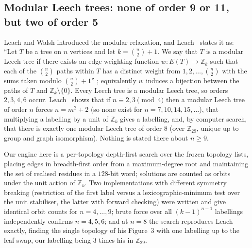 \documentclass[11pt,a4paper]{article}
\theoremstyle{plain}
\theoremstyle{remark}
\newcommand{\Z}{\mathbb{Z}}
\newcommand{\bin}[2]{\binom{#1}{#2}}
\begin{document}
\subsection{Modular Leech trees: none of order 9 or 11, but two of order 5}
\label{sec:modular}

Leach and Walsh introduced the modular relaxation, and Leach~\cite{Leach2014}
states it as: ``Let $T$ be a tree on $n$ vertices and let $k=\bin n2+1$.  We say
that $T$ is a modular Leech tree if there exists an edge weighting function
$w:E(T)\to\Z_k$ such that each of the $\bin n2$ paths within $T$ has a distinct
weight from $1,2,\dots,\bin n2$ with the sums taken modulo $\bin n2+1$''
\cite[p.~1]{Leach2014}; equivalently $w$ induces a bijection between the paths of
$T$ and $\Z_k\setminus\{0\}$.  Every Leech tree is a modular Leech tree, so
orders $2,3,4,6$ occur.  Leach~\cite[Thms.~1--2]{Leach2014} shows that if
$n\equiv 2,3\pmod 4$ then a modular Leech tree of order $n$ forces $n=m^2+2$
(so none exist for $n=7,10,14,15,\dots$), that multiplying a labelling by a unit
of $\Z_k$ gives a labelling, and, by computer search, that there is exactly one
modular Leech tree of order $8$ (over $\Z_{29}$, unique up to group and graph
isomorphism).  Nothing is stated there about $n\ge 9$.

Our engine here is a per-topology depth-first search over the frozen topology
lists, placing edges in breadth-first order from a maximum-degree root and
maintaining the set of realised residues in a $128$-bit word; solutions are
counted as orbits under the unit action of $\Z_k$.  Two implementations with
different symmetry breaking (restriction of the first label versus a
lexicographic-minimum test over the unit stabiliser, the latter with forward
checking) were written and give identical orbit counts for $n=4,\dots,9$;
brute force over all $(k-1)^{n-1}$ labellings independently confirms $n=4,5,6$;
and at $n=8$ the search reproduces Leach exactly, finding the single topology of
his Figure~3 with one labelling up to the leaf swap, our labelling being
$3$ times his in $\Z_{29}$.
\end{document}
